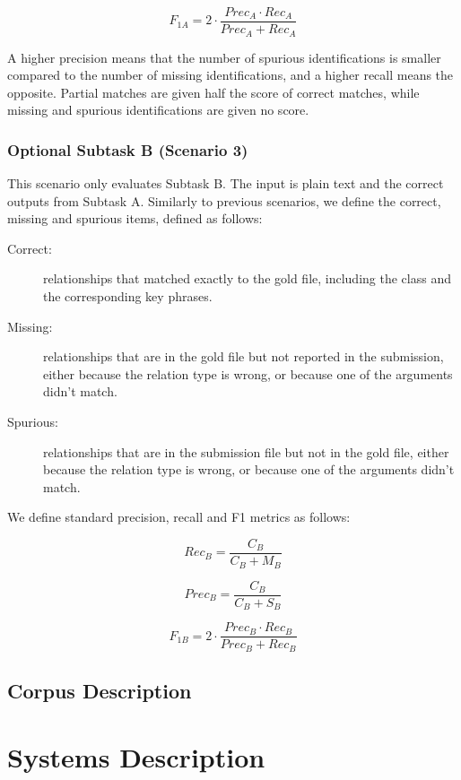 \documentclass[11pt,a4paper]{article}
\begin{document}
$$F_{1A} = 2 \cdot \frac{Prec_{A} \cdot Rec_{A}}{Prec_{A} + Rec_{A}} $$

A higher precision means that the number of spurious identifications is smaller compared to the number of missing identifications, and a higher recall means the opposite. Partial matches are given half the score of correct matches, while missing and spurious identifications are given no score.

\subsubsection{Optional Subtask B (Scenario 3)}

This scenario only evaluates Subtask B. The input is plain text and the correct outputs from Subtask A. Similarly to previous scenarios, we define the correct, missing and spurious items, defined as follows:

\begin{description}
    \item[Correct:] relationships that matched exactly to the gold file, including the class and the corresponding key phrases.
    \item[Missing:] relationships that are in the gold file but not reported in the submission, either because the relation type is wrong, or because one of the arguments didn’t match.
    \item[Spurious:] relationships that are in the submission file but not in the gold file, either because the relation type is wrong, or because one of the arguments didn’t match.
\end{description}

We define standard precision, recall and F1 metrics as follows:

$$Rec_{B} = \frac{C_B}{C_B + M_B} $$

$$Prec_{B} = \frac{C_B}{C_B + S_B} $$

$$F_{1B} = 2 \cdot \frac{Prec_{B} \cdot Rec_{B}}{Prec_{B} + Rec_{B}} $$


\subsection{Corpus Description}


\section{Systems Description}\label{sec:desc}
\end{document}
